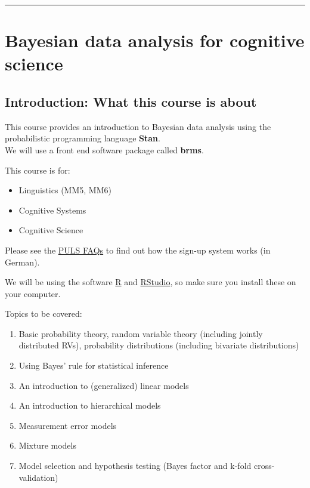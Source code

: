 \documentclass[
  letterpaper,
  DIV=11,
  numbers=noendperiod]{scrreprt}
\providecommand{\tightlist}{%
  \setlength{\itemsep}{0pt}\setlength{\parskip}{0pt}}
\begin{document}
\begin{center}\rule{0.5\linewidth}{0.5pt}\end{center}


\chapter{Bayesian data analysis for cognitive
science}\label{bayesian-data-analysis-for-cognitive-science}

\section{Introduction: What this course is
about}\label{introduction-what-this-course-is-about}

This course provides an introduction to Bayesian data analysis using the
probabilistic programming language \textbf{Stan}.\\
We will use a front end software package called \textbf{brms}.

This course is for:

\begin{itemize}
\tightlist
\item
  Linguistics (MM5, MM6)
\item
  Cognitive Systems
\item
  Cognitive Science
\end{itemize}

Please see the
\href{http://stud.astaup.de/~linguistik/doku.php?id=puls-faq}{PULS FAQs}
to find out how the sign-up system works (in German).

We will be using the software \href{http://cran.r-project.org/}{R} and
\href{https://www.rstudio.com/}{RStudio}, so make sure you install these
on your computer.

Topics to be covered:

\begin{enumerate}
\def\labelenumi{\arabic{enumi}.}
\tightlist
\item
  Basic probability theory, random variable theory (including jointly
  distributed RVs), probability distributions (including bivariate
  distributions)
\item
  Using Bayes' rule for statistical inference
\item
  An introduction to (generalized) linear models
\item
  An introduction to hierarchical models
\item
  Measurement error models
\item
  Mixture models
\item
  Model selection and hypothesis testing (Bayes factor and k-fold
  cross-validation)
\end{enumerate}
\end{document}
